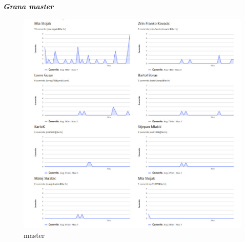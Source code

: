 		
		\begin{packed_item}
			\item \textbf{\textit{Grana master}}\\
			
			\begin{figure}[h!]
				\centering
				\includegraphics[width=\linewidth]{./slike/master.jpeg}
				\caption{master}
			\end{figure}
			\eject
		\end{packed_item}
	

